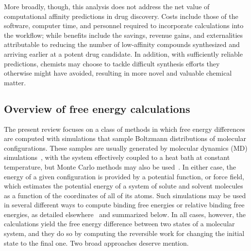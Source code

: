 \documentclass[aps,pre,twocolumn,nofootinbib,superscriptaddress,10pt, final,tightenlines]{revtex4-1}
\begin{document}
More broadly, though, this analysis does not address the net value of computational affinity predictions in drug discovery.
Costs include those of the software, computer time, and personnel required to incorporate calculations into the workflow; while benefits include the savings, revenue gains, and externalities attributable to reducing the number of low-affinity compounds synthesized and arriving earlier at a potent drug candidate.
In addition, with sufficiently reliable predictions, chemists may choose to tackle difficult synthesis efforts they otherwise might have avoided, resulting in more novel and valuable chemical matter.

\subsection{Overview of free energy calculations}
\label{sec:FEMethods}
The present review focuses on a class of methods in which free energy differences are computed with simulations that sample Boltzmann distributions of molecular configurations. 
These samples are usually generated by molecular dynamics (MD) simulations~\cite{karplus_molecular_2002}, with the system effectively coupled to a heat bath at constant temperature, but Monte Carlo methods may also be used~\cite{michel_hit_2008, michel_prediction_2010, cole_molecular_2015}.  
In either case, the energy of a given configuration is provided by a potential function, or force field, which estimates the potential energy of a system of solute and solvent molecules as a function of the coordinates of all of its atoms. 
Such simulations may be used in several different ways to compute binding free energies or relative binding free energies, as detailed elsewhere~\cite{michel_prediction_2010, christ_basic_2010,  chodera_alchemical_2011, shirts_introduction_2013} and summarized below. In all cases, however, the calculations yield the free energy difference between two states of a molecular system, and they do so by computing the reversible work for changing the initial state to the final one. Two broad approaches deserve mention.
\end{document}
